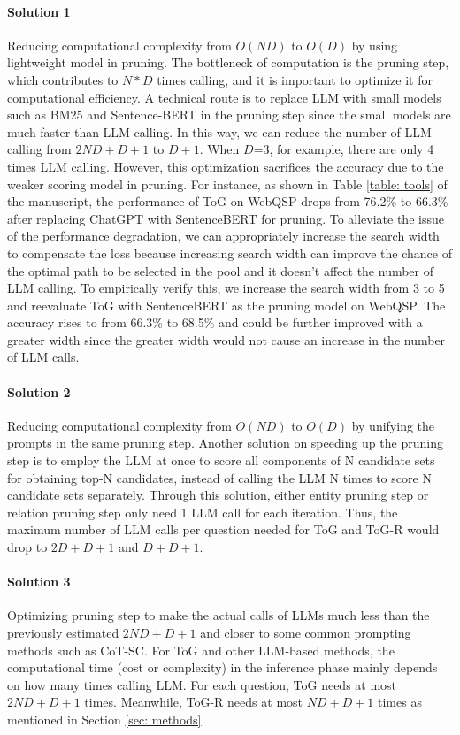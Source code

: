 \documentclass{article} %
\begin{document}
\paragraph{Solution 1}
Reducing computational complexity from $O(ND)$ to $O(D)$ by using lightweight model in pruning. The bottleneck of computation is the pruning step, which contributes to $N*D$ times calling, and it is important to optimize it for computational efficiency. A technical route is to replace LLM with small models such as BM25 and Sentence-BERT in the pruning step since the small models are much faster than LLM calling. In this way, we can reduce the number of LLM calling from $2ND+D+1$ to $D+1$. When $D$=3, for example, there are only 4 times LLM calling. However, this optimization sacrifices the accuracy due to the weaker scoring model in pruning. For instance, as shown in Table \ref{table: tools} of the manuscript, the performance of ToG on WebQSP drops from 76.2\% to 66.3\% after replacing ChatGPT with SentenceBERT for pruning. To alleviate the issue of the performance degradation, we can appropriately increase the search width to compensate the loss because increasing search width can improve the chance of the optimal path to be selected in the pool and it doesn't affect the number of LLM calling. To empirically verify this, we increase the search width from 3 to 5 and reevaluate ToG with SentenceBERT as the pruning model on WebQSP. The accuracy rises to from 66.3\% to 68.5\% and could be further improved with a greater width since the greater width would not cause an increase in the number of LLM calls.

\paragraph{Solution 2}
Reducing computational complexity from $O(ND)$ to $O(D)$ by unifying the prompts in the same pruning step. Another solution on speeding up the pruning step is to employ the LLM at once to score all components of N candidate sets for obtaining top-N candidates, instead of calling the LLM N times to score N candidate sets separately. Through this solution, either entity pruning step or relation pruning step only need 1 LLM call for each iteration. Thus, the maximum number of LLM calls per question needed for ToG and ToG-R would drop to $2D+D+1$ and $D+D+1$.

\paragraph{Solution 3}
Optimizing pruning step to make the actual calls of LLMs much less than the previously estimated $2ND+D+1$ and closer to some common prompting methods such as CoT-SC. For ToG and other LLM-based methods, the computational time (cost or complexity) in the inference phase mainly depends on how many times calling LLM. For each question, ToG needs at most $2ND + D + 1$ times. Meanwhile, ToG-R needs at most $ND+D+1$ times as mentioned in Section \ref{sec: methods}. 
\end{document}
